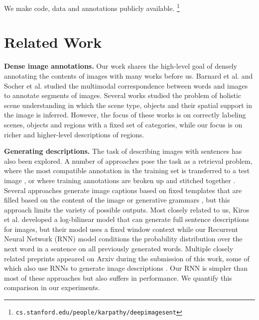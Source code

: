 \documentclass[10pt,twocolumn,letterpaper]{article}
\begin{document}
We make code, data and annotations publicly available. \footnote{\texttt{cs.stanford.edu/people/karpathy/deepimagesent}}

\vspace{-0.1in}
\section{Related Work}
\vspace{-0.1in}

\textbf{Dense image annotations.} Our work shares the high-level goal of densely annotating the contents of images with many works before us. Barnard et al. \cite{barnard2003matching} and Socher et al. \cite{socher2010connecting} studied the multimodal correspondence between words and images to annotate segments of images. Several works \cite{li2009towards,gould2009decomposing,fidler2013sentence,li2007and} studied the problem of holistic scene understanding in which the scene type, objects and their spatial support in the image is inferred. However, the focus of these works is on correctly labeling scenes, objects and regions with a fixed set of categories, while our focus is on richer and higher-level descriptions of regions.

\textbf{Generating descriptions.} The task of describing images with sentences has also been explored. A number of approaches pose the task as a retrieval problem, where the most compatible annotation in the training set is transferred to a test image \cite{hodosh2013framing,sochergrounded,farhadi2010every,ordonez2011im2text,JiaICCV11}, or where training annotations are broken up and stitched together \cite{Kuznetsova2012,lisiming2011,kuznetsova2014treetalk}. Several approaches generate image captions based on fixed templates that are filled based on the content of the image \cite{gupta2012image,kulkarni2011baby,farhadi2010every,yang2011corpus,yao2010i2t,elliott2013image,barbu2012video} or generative grammars  \cite{Mitchell2012,yatskar2014see}, but this approach limits the variety of possible outputs. Most closely related to us, Kiros et al. \cite{kirosmultimodal} developed a log-bilinear model that can generate full sentence descriptions for images, but their model uses a fixed window context while our Recurrent Neural Network (RNN) model conditions the probability distribution over the next word in a sentence on all previously generated words. Multiple closely related preprints appeared on Arxiv during the submission of this work, some of which also use RNNs to generate image descriptions \cite{mao2014explain,vinyals2014show,donahue2014long,kiros2014unifying,fang2014captions,chen14}. Our RNN is simpler than most of these approaches but also suffers in performance. We quantify this comparison in our experiments.
\end{document}
